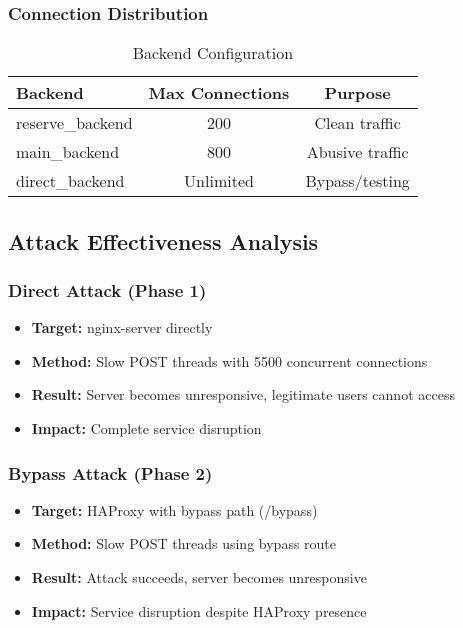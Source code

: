 \documentclass[12pt]{article}
\begin{document}
\subsubsection{Connection Distribution}
\begin{table}[H]
\centering
\begin{tabular}{|l|c|c|}
\hline
\textbf{Backend} & \textbf{Max Connections} & \textbf{Purpose} \\
\hline
reserve\_backend & 200 & Clean traffic \\
\hline
main\_backend & 800 & Abusive traffic \\
\hline
direct\_backend & Unlimited & Bypass/testing \\
\hline
\end{tabular}
\caption{Backend Configuration}
\label{tab:backends}
\end{table}

\subsection{Attack Effectiveness Analysis}

\subsubsection{Direct Attack (Phase 1)}
\begin{itemize}
    \item \textbf{Target:} nginx-server directly
    \item \textbf{Method:} Slow POST threads with 5500 concurrent connections
    \item \textbf{Result:} Server becomes unresponsive, legitimate users cannot access
    \item \textbf{Impact:} Complete service disruption
\end{itemize}

\subsubsection{Bypass Attack (Phase 2)}
\begin{itemize}
    \item \textbf{Target:} HAProxy with bypass path (/bypass)
    \item \textbf{Method:} Slow POST threads using bypass route
    \item \textbf{Result:} Attack succeeds, server becomes unresponsive
    \item \textbf{Impact:} Service disruption despite HAProxy presence
\end{itemize}
\end{document}
